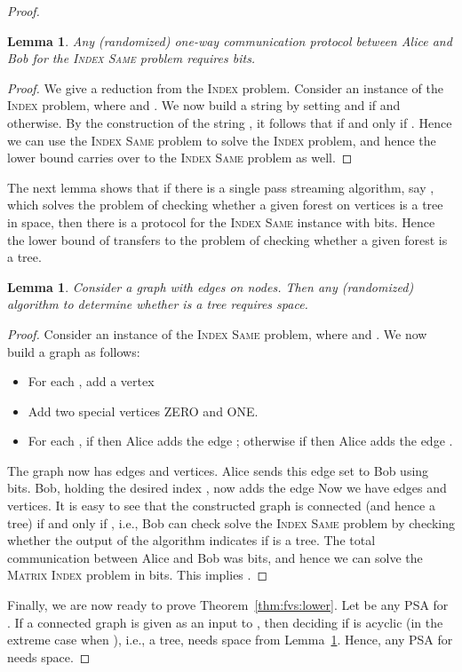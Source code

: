 \documentclass[11pt,letter]{article}
\newtheorem{lemma}[theorem]{Lemma}
\begin{document}
\begin{proof}
{\begin{lemma}
Any (randomized) one-way communication protocol between Alice and Bob for the \textsc{Index Same} problem requires  bits.\label{thm:lower-index-same}
\end{lemma}
\begin{proof}
We give a reduction from the \textsc{Index} problem. Consider an instance  of the \textsc{Index} problem, where  and . We now build a string  by setting  and  if  and  otherwise. By the construction of the string , it follows that  if and only if . Hence we can use the \textsc{Index Same} problem to solve the \textsc{Index} problem, and hence the lower bound carries over to the \textsc{Index Same} problem as well.
\end{proof}

The next lemma shows that if there is a single pass streaming
algorithm, say , which solves the problem of checking
whether a given forest on  vertices is a tree
in  space, then there is a protocol for the \textsc{Index Same} instance with  bits. Hence the lower bound of  transfers to the problem of checking whether a given forest is a tree.

\begin{lemma}
Consider a graph  with  edges on  nodes. Then any (randomized) algorithm to determine whether  is a tree requires  space. \label{thm:lower-bound-checking-tree}
\end{lemma}
\begin{proof}
Consider an instance  of the \textsc{Index Same} problem, where  and . We now build a graph as follows:
\begin{itemize}
\item For each , add a vertex 
\item Add two special vertices ZERO and ONE.
\item For each , if  then Alice adds the edge ; otherwise if  then Alice adds the edge .
\end{itemize}
The graph now has  edges and  vertices. Alice sends this edge
set to Bob using  bits.
Bob, holding the desired index , now adds the edge 
Now we have  edges and  vertices. It is easy to see that the
constructed graph is connected (and hence a tree) if and only if
, i.e., Bob can check solve the \textsc{Index Same}
problem by checking whether the output of the algorithm 
indicates if  is a tree.
The total communication between Alice and Bob was  bits, and hence we can solve the \textsc{Matrix Index} problem in  bits. This implies .
\end{proof}

Finally, we are now ready to prove Theorem~\ref{thm:fvs:lower}.
Let  be any PSA for . If a connected graph  is
given as an input to , then deciding if  is acyclic
(in the extreme case when ),
i.e., a tree, needs  space from Lemma~\ref{thm:lower-bound-checking-tree}. Hence, any PSA for  needs  space.
}
\end{proof}
\end{document}
